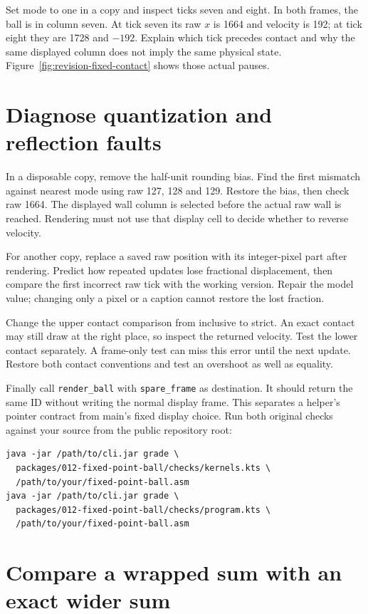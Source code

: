 Set mode to one in a copy and inspect ticks seven and eight. In both frames,
the ball is in column seven. At tick seven its raw $x$ is 1664 and velocity is
192; at tick eight they are 1728 and $-192$. Explain which tick precedes contact
and why the same displayed column does not imply the same physical state.
Figure~\ref{fig:revision-fixed-contact} shows those actual pauses.



\section{Diagnose quantization and reflection faults}

In a disposable copy, remove the half-unit rounding bias. Find the first mismatch
against nearest mode using raw 127, 128 and 129. Restore the bias, then check raw
1664. The displayed wall column is selected before the actual raw wall is reached.
Rendering must not use that display cell to decide whether to reverse velocity.

For another copy, replace a saved raw position with its integer-pixel part after
rendering. Predict how repeated updates lose fractional displacement, then compare
the first incorrect raw tick with the working version. Repair the model value;
changing only a pixel or a caption cannot restore the lost fraction.

Change the upper contact comparison from inclusive to strict. An exact contact
may still draw at the right place, so inspect the returned velocity. Test the
lower contact separately. A frame-only test can miss this error until the next
update. Restore both contact conventions and test an overshoot as well as equality.

Finally call \texttt{render\_ball} with \texttt{spare\_frame} as destination.
It should return the same ID without writing the normal display frame. This
separates a helper's pointer contract from main's fixed display choice. Run both
original checks against your source from the public repository root:
\begin{verbatim}
java -jar /path/to/cli.jar grade \
  packages/012-fixed-point-ball/checks/kernels.kts \
  /path/to/your/fixed-point-ball.asm
java -jar /path/to/cli.jar grade \
  packages/012-fixed-point-ball/checks/program.kts \
  /path/to/your/fixed-point-ball.asm
\end{verbatim}

\section{Compare a wrapped sum with an exact wider sum}

